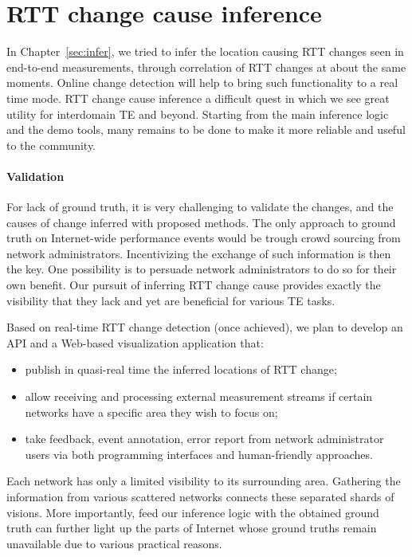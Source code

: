 \section{RTT change cause inference}
In Chapter~\ref{sec:infer}, we tried to infer the location causing RTT changes seen in end-to-end measurements, through correlation of RTT changes at about the same moments.
Online change detection will help to bring such functionality to a real time mode.
RTT change cause inference a difficult quest in which we see great utility for interdomain TE and beyond. Starting from the main inference logic and the demo tools, many remains to be done to make it more reliable and useful to the community.

\paragraph*{Validation} For lack of ground truth, it is very challenging to validate the changes, and the causes of change inferred with proposed methods. The only approach to ground truth on Internet-wide performance events would be trough crowd sourcing from network administrators.
Incentivizing the exchange of such information is then the key.
One possibility is to persuade network administrators to do so for their own benefit.
Our pursuit of inferring RTT change cause provides exactly the visibility that they lack and yet are beneficial for various TE tasks.

Based on real-time RTT change detection (once achieved), we plan to develop an API and a Web-based visualization application that:
\begin{itemize}
\item publish in quasi-real time the inferred locations of RTT change;
\item allow receiving and processing external measurement streams if certain networks have a specific area they wish to focus on;
\item take feedback, event annotation, error report from network administrator users via both programming interfaces and human-friendly approaches. 
\end{itemize}
Each network has only a limited visibility to its surrounding area. Gathering the information from various scattered networks connects these separated shards of visions. More importantly, feed our inference logic with the obtained ground truth can further light up the parts of Internet whose ground truths remain unavailable due to various practical reasons.

